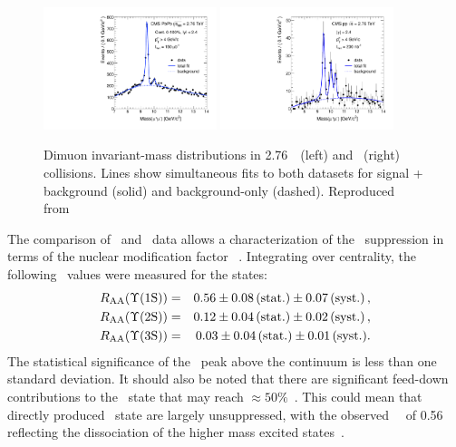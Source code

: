 \begin{figure}[t]
\begin{center}
    \includegraphics[width=0.45\textwidth]{qqbarfigures/hiFitPt4Erf}
    \includegraphics[width=0.45\textwidth]{qqbarfigures/ppFitPt4Erf}
    \caption{Dimuon invariant-mass distributions in 2.76\TeV\ \PbPb\ (left) and \pp\ (right)
collisions.  Lines show simultaneous fits to both
datasets for signal + background (solid) and background-only (dashed).
Reproduced from~\cite{Chatrchyan:2012lxa}}
\label{fig:GR:mass}
\end{center}
\end{figure}

The comparison of \pp\ and \PbPb\ data allows a characterization of the \PgU\ suppression
in terms of the nuclear modification factor \Raa~\cite{Chatrchyan:2012lxa}.
Integrating over centrality, the following \Raa\ values were measured for the \PgUn states:
\begin{eqnarray}
R_\mathrm{AA} (\Upsilon\mathrm{(1S)}) &=& 0.56 \pm 0.08\,\mbox{(stat.)} \pm 0.07\,\mbox{(syst.)} \,, \\
R_\mathrm{AA} (\Upsilon\mathrm{(2S)}) &=& 0.12 \pm 0.04\,\mbox{(stat.)} \pm 0.02\,\mbox{(syst.)} \,, \nonumber \\
R_\mathrm{AA} (\Upsilon\mathrm{(3S)}) &=& 0.03 \pm 0.04\,\mbox{(stat.)} \pm 0.01\,\mbox{(syst.)} .  \nonumber
\end{eqnarray}
The statistical significance of the \PgUc\ peak above the continuum is less than one standard deviation.
It should also be noted that there are significant feed-down contributions to
the \PgUa\ state that may reach $\approx 50\%$~\cite{Affolder:1999wm, Aaij:2012se}.
This could mean that directly produced \PgUa\ state are largely unsuppressed, with
the observed \PgUa\ \Raa\ of 0.56 reflecting the dissociation of the higher 
mass excited states~\cite{Chatrchyan:2012lxa}.

